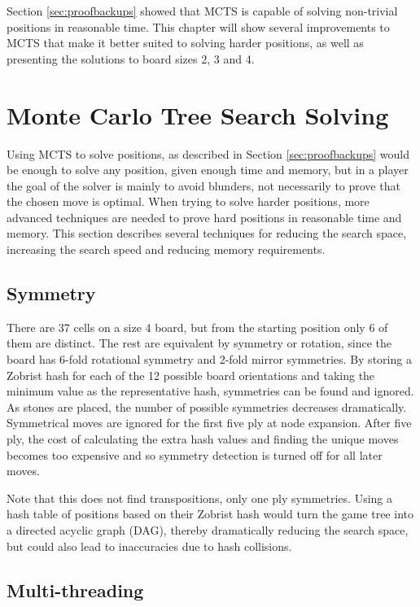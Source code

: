 


Section \ref{sec:proofbackups} showed that MCTS is capable of solving non-trivial positions in reasonable time. This chapter will show several improvements to MCTS that make it better suited to solving harder positions, as well as presenting the solutions to board sizes 2, 3 and 4.


\section{Monte Carlo Tree Search Solving}

Using MCTS to solve positions, as described in Section \ref{sec:proofbackups} would be enough to solve any position, given enough time and memory, but in a player the goal of the solver is mainly to avoid blunders, not necessarily to prove that the chosen move is optimal. When trying to solve harder positions, more advanced techniques are needed to prove hard positions in reasonable time and memory. This section describes several techniques for reducing the search space, increasing the search speed and reducing memory requirements.


\subsection{Symmetry}

There are 37 cells on a size 4 board, but from the starting position only 6 of them are distinct. The rest are equivalent by symmetry or rotation, since the board has 6-fold rotational symmetry and 2-fold mirror symmetries. By storing a Zobrist hash for each of the 12 possible board orientations and taking the minimum value as the representative hash, symmetries can be found and ignored. As stones are placed, the number of possible symmetries decreases dramatically. Symmetrical moves are ignored for the first five ply at node expansion. After five ply, the cost of calculating the extra hash values and finding the unique moves becomes too expensive and so symmetry detection is turned off for all later moves.

Note that this does not find transpositions, only one ply symmetries. Using a hash table of positions based on their Zobrist hash would turn the game tree into a directed acyclic graph (DAG), thereby dramatically reducing the search space, but could also lead to inaccuracies due to hash collisions.

\subsection{Multi-threading}

